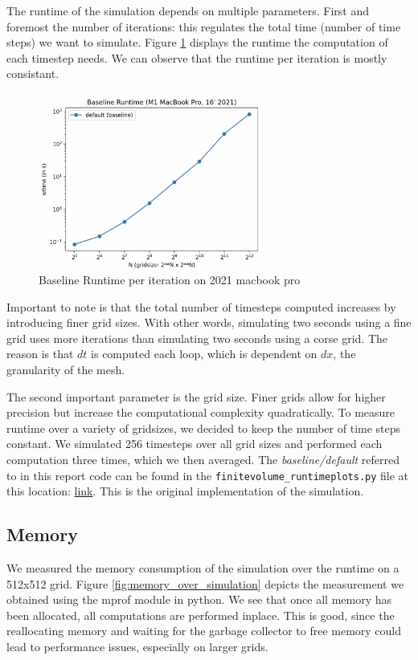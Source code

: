 \documentclass[a4paper,10pt]{article}
\begin{document}
The runtime of the simulation depends on multiple parameters.
First and foremost the number of iterations:
this regulates the total time (number of time steps) we want to simulate.
Figure \ref{fig:runtime_per_iteration} displays the runtime the computation of each timestep needs.
We can observe that the runtime per iteration is mostly consistant.
\begin{figure}[h]
  \centering
  \includegraphics[width=0.7\textwidth]{images/baseline/baseline_performance.png}
  \caption{Baseline Runtime per iteration on 2021 macbook pro}
  \label{fig:runtime_per_iteration}
\end{figure}
Important to note is that the total number of timesteps computed increases by introducing finer grid sizes.
With other words, simulating two seconds using a fine grid uses more iterations than simulating two seconds using a corse grid. 
The reason is that $dt$ is computed each loop, which is dependent on $dx$, the granularity of the mesh.

The second important parameter is the grid size.
Finer grids allow for higher precision but increase the computational complexity quadratically.
To measure runtime over a variety of gridsizes, we decided to keep the number of time steps constant.
We simulated 256 timesteps over all grid sizes and performed each computation three times, which we then averaged. The \textit{baseline/default} referred to in this report code can be found in the \verb|finitevolume_runtimeplots.py| file at this location: \href{https://github.com/paulmyr/DD2358-HPC25/blob/master/10_project_rishi_paul/code/finitevolume_runtimeplots.py}{link}. This is the original implementation of the simulation.

\subsection{Memory}
We measured the memory consumption of the simulation over the runtime on a 512x512 grid.
Figure \ref{fig:memory_over_simulation} depicts the measurement we obtained using the mprof module in python.
We see that once all memory has been allocated, all computations are performed inplace.
This is good, since the reallocating memory and waiting for the garbage collector to free memory could lead to performance issues, especially on larger grids.
\end{document}
